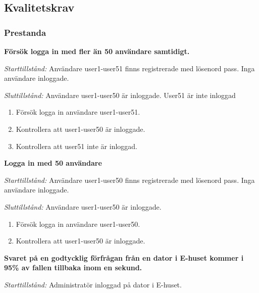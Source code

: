 \documentclass[a4paper]{article}
\begin{document}




\subsection{Kvalitetskrav}

\subsubsection{Prestanda}

\begin{ST}
\item
\textbf{Försök logga in med fler än 50 användare samtidigt.}

\emph{Starttillstånd:} Användare user1-user51 finns registrerade med lösenord pass. Inga användare inloggade.

\emph{Sluttillstånd:} Användare user1-user50 är inloggade. User51 är inte inloggad

\begin{enumerate}

\item
Försök logga in användare user1-user51.
\item
Kontrollera att user1-user50 är inloggade.
\item
Kontrollera att user51 inte är inloggad.
\end{enumerate}

\item
\textbf{Logga in med 50 användare}

\emph{Starttillstånd:} Användare user1-user50 finns registrerade med lösenord pass. Inga användare inloggade.

\emph{Sluttillstånd:} Användare user1-user50 är inloggade.

\begin{enumerate}

\item
Försök logga in användare user1-user50.
\item
Kontrollera att user1-user50 är inloggade.
\end{enumerate}


\item
\textbf{Svaret på en godtycklig förfrågan från en dator i E-huset kommer i 95\% av fallen tillbaka
inom en sekund.}

\emph{Starttillstånd:} Administratör inloggad på dator i E-huset.


\end{ST}
\end{document}
